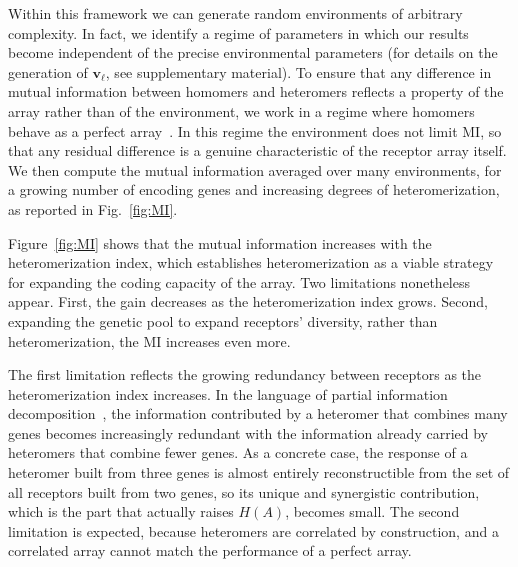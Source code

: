 \documentclass[aps,pre,twocolumn,superscriptaddress,floatfix,longbibliography]{revtex4-2}
\begin{document}
Within this framework we can generate random environments of arbitrary
complexity. In fact, we identify a regime of parameters in which our results
become independent of the precise environmental parameters (for details on
the generation of $\mathbf{v}_\ell$, see supplementary material). To
ensure that any difference in mutual information between homomers and
heteromers reflects a property of the array rather than of the environment, we
work in a regime where homomers behave as a perfect
array~\cite{zwicker_receptor_2016}. In this regime the environment does not
limit MI, so that any residual difference is a genuine
characteristic of the receptor array itself. We then compute the mutual information
averaged over many environments, for a growing number of encoding genes and
increasing degrees of heteromerization, as reported in Fig.~\ref{fig:MI}.

Figure~\ref{fig:MI} shows that the mutual information increases with the
heteromerization index, which establishes heteromerization as a viable
strategy for expanding the coding capacity of the array. Two limitations
nonetheless appear. First, the gain decreases as the heteromerization index
grows. Second, expanding the genetic pool to expand receptors' diversity, rather than heteromerization, the MI increases even more.

{\color{blue}
The first limitation reflects the growing redundancy between receptors as the
heteromerization index increases. In the language of partial information
decomposition~\cite{williams_nonnegative_2010}, the information contributed by
a heteromer that combines many genes becomes increasingly redundant with the
information already carried by heteromers that combine fewer genes. As a
concrete case, the response of a heteromer built from three genes is almost
entirely reconstructible from the set of all receptors built from two genes,
so its unique and synergistic contribution, which is the part that actually
raises $H(A)$, becomes small. The second limitation is expected, because
heteromers are correlated by construction, and a correlated array cannot match
the performance of a perfect array.
}
\end{document}
